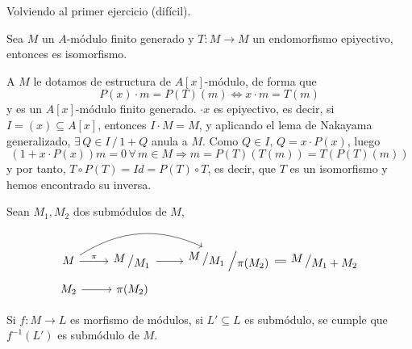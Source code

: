 
Volviendo al primer ejercicio (dif\'icil). 

\begin{prop}
    Sea $M$ un $A$-m\'odulo finito generado y $T: M \longrightarrow M$ un endomorfismo epiyectivo, entonces es isomorfismo.
\end{prop}
\begin{dem}
    A $M$ le dotamos de estructura de $A[x]$-m\'odulo, de forma que 
    $$P(x) \cdot m = P(T)(m) \iff x\cdot m = T(m)$$
    y es un $A[x]$-m\'odulo finito generado. $\cdot x$ es epiyectivo, es decir, si $I=(x) \subseteq A[x]$, entonces $I \cdot M = M$, y aplicando el lema de Nakayama generalizado, $\exists \, Q \in I \, / \, 1+Q $ anula a $M$. Como $Q\in I, \, Q=x\cdot P(x)$, luego 
    $$(1+x\cdot P(x))m = 0 \, \forall\, m \in M \Rightarrow m = P(T)(T(m)) = T(P(T)(m)) $$
    y por tanto, $T \circ P(T) = Id = P(T) \circ T$, es decir, que $T$ es un isomorfismo y hemos encontrado su inversa. 
\end{dem}
\begin{ejer}
    
Sean $M_1,M_2$ dos subm\'odulos de $M$, 
$$\bt M\rar{\pi} \arrow[bend left=10mm]{rr} & \modulo{M}{M_1} \rar & \modulo{\modulo{M}{M_1}}{\pi(M_2)} \arrow[equal]{r} &[-5mm] \modulo{M}{M_1 + M_2}  \\[-5mm] M_2 \rar & \pi(M_2) \et$$
\end{ejer}

\begin{obs}
    Si $f: M\longrightarrow L$ es morfismo de m\'odulos, si $L' \subseteq L$ es subm\'odulo, se cumple que $f^{-1}(L')$ es subm\'odulo de $M$.
\end{obs}

